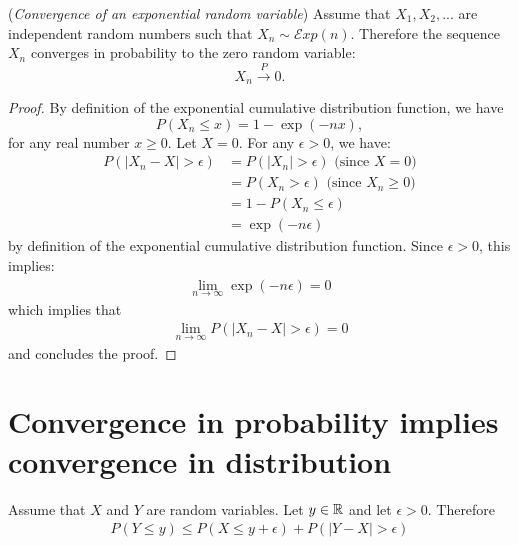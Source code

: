 \documentclass{article}
\begin{document}
\begin{example}
(\emph{Convergence of an exponential random variable})
Assume that $X_1,X_2,...$ are independent random numbers such that $X_n\sim \mathcal{E}xp(n)$. 
Therefore the sequence $X_n$ converges in probability to the zero random variable:
$$
X_n \xrightarrow{P} 0.
$$
\end{example}

\begin{proof}
By definition of the exponential cumulative distribution function, we have 
$$
P(X_n\leq x) = 1 - \exp(-nx),
$$
for any real number $x\geq 0$. 
Let $X=0$. 
For any $\epsilon>0$, we have:
\begin{align*}
P(|X_n-X|>\epsilon)
&= P(|X_n|>\epsilon) \textrm{ (since $X=0$)} \\
&= P(X_n>\epsilon) \textrm{ (since $X_n\geq 0$)} \\
&= 1 - P(X_n\leq \epsilon) \\
&= \exp(-n\epsilon)
\end{align*}
by definition of the exponential cumulative distribution function. 
Since $\epsilon>0$, this implies:
\begin{align*}
\lim_{n\rightarrow \infty} \exp(-n\epsilon) = 0 
\end{align*}
which implies that 
\begin{align*}
\lim_{n\rightarrow \infty} P(|X_n-X|>\epsilon) = 0 
\end{align*}
and concludes the proof.
\end{proof}


\section{Convergence in probability implies convergence in distribution}

\begin{theorem}
\label{theo-doubleproba}
Assume that $X$ and $Y$ are random variables. 
Let $y\in\mathbb{R}$ and let $\epsilon>0$. 
Therefore
\begin{align}
\label{eq-doubleproba}
P(Y\leq y) \leq P(X\leq y+\epsilon) + P(|Y-X|> \epsilon)
\end{align}
\end{theorem}
\end{document}
